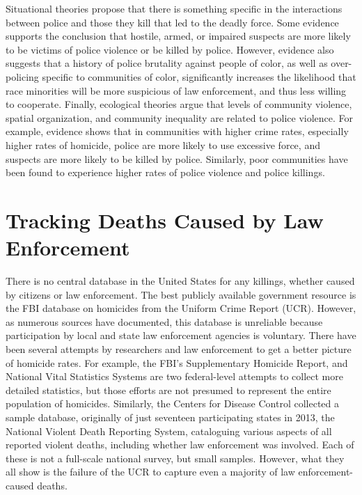 \documentclass[sigconf]{acmart}
\begin{document}
Situational theories propose that there is something specific in the interactions between police and those they kill that led to the deadly force.  Some evidence supports the conclusion that hostile, armed, or impaired suspects are more likely to be victims of police violence or be killed by police.  \cite{nix17}  However, evidence also suggests that a history of police brutality against people of color, as well as over-policing specific to communities of color, significantly increases the likelihood that race minorities will be more suspicious of law enforcement, and thus less willing to cooperate. \cite{payne17,kent05} Finally, ecological theories argue that levels of community violence, spatial organization, and community inequality are related to police violence.  For example, evidence shows that in communities with higher crime rates, especially higher rates of homicide, police are more likely to use excessive force, and suspects are more likely to be killed by police. \cite{nix17,smith04,smith14}  Similarly, poor communities have been found to experience higher rates of police violence and police killings. \cite{jacobs02,meeks06,stults07,legewie15,payne17}

\section{Tracking Deaths Caused by Law Enforcement}
There is no central database in the United States for any killings, whether caused by citizens or law enforcement.  The best publicly available government resource is the FBI database on homicides from the Uniform Crime Report (UCR).  However, as numerous sources have documented, this database is unreliable because participation by local and state law enforcement agencies is voluntary. \cite{currie16,pridemore05,dalton17} There have been several attempts by researchers and law enforcement to get a better picture of homicide rates.  For example, the FBI's Supplementary Homicide Report, and National Vital Statistics Systems are two federal-level attempts to collect more detailed statistics, but those efforts are not presumed to represent the entire population of homicides. \cite{pridemore05}  Similarly, the Centers for Disease Control collected a sample database, originally of just seventeen participating states in 2013, the National Violent Death Reporting System, cataloguing various aspects of all reported violent deaths, including whether law enforcement was involved. \cite{cdc13}  Each of these is not a full-scale national survey, but small samples.  However, what they all show is the failure of the UCR to capture even a majority of law enforcement-caused deaths.
\end{document}
